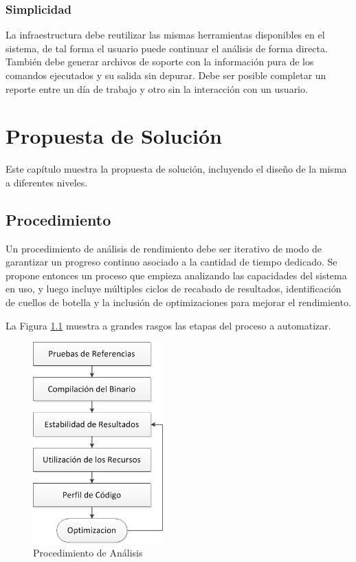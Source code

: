 \documentclass[a4paper]{report}
\begin{document}
\subsection*{Simplicidad}

La infraestructura debe reutilizar las mismas herramientas disponibles en el sistema, de tal forma el usuario puede continuar el análisis de forma directa.
También debe generar archivos de soporte con la información pura de los comandos ejecutados y su salida sin depurar.
Debe ser posible completar un reporte entre un día de trabajo y otro sin la interacción con un usuario.

\chapter{Propuesta de Solución} \label{Propuesta de Solucion}

Este capítulo muestra la propuesta de solución, incluyendo el diseño de la misma a diferentes niveles.

\section{Procedimiento}

Un procedimiento de análisis de rendimiento debe ser iterativo de modo de garantizar un progreso continuo asociado a la cantidad de tiempo dedicado.
Se propone entonces un proceso que empieza analizando las capacidades del sistema en uso, y luego incluye múltiples ciclos de recabado de resultados,
identificación de cuellos de botella y la inclusión de optimizaciones para mejorar el rendimiento.

\bigskip

La Figura \ref{fig:procedure} muestra a grandes rasgos las etapas del proceso a automatizar.

\begin{figure}[H]
\label{fig:procedure}
\centering
\includegraphics[width=5cm]{procedure.png}
\caption{Procedimiento de Análisis}
\end{figure}
\end{document}
